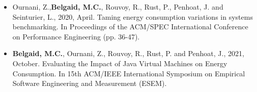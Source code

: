 \documentclass[10pt,a4paper,ragged2e,withhyper]{altacv}
\begin{document}
\begin{paracol}{2}


  \medskip


  \divider

  \divider


  \switchcolumn
  \medskip


  \medskip

  \begin{itemize}
    \item  Ournani, Z.,\textbf{Belgaid, M.C.}, Rouvoy, R., Rust, P., Penhoat, J. and Seinturier, L., 2020, April. Taming energy consumption variations in systems benchmarking. In Proceedings of the ACM/SPEC International Conference on Performance Engineering (pp. 36-47).
          \medskip
    \item  \textbf{Belgaid, M.C.}, Ournani, Z., Rouvoy, R., Rust, P. and Penhoat, J., 2021, October. Evaluating the Impact of Java Virtual Machines on Energy Consumption. In 15th ACM/IEEE International Symposium on Empirical Software Engineering and Measurement (ESEM).

  \end{itemize}


\end{paracol}
\end{document}
